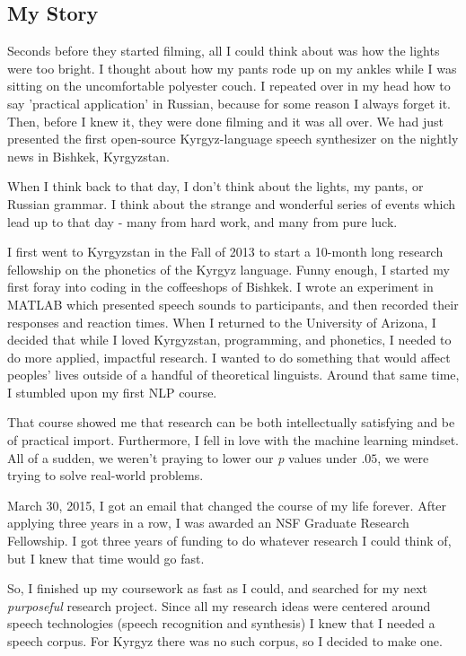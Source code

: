 \documentclass[12pt,a4paper]{article}
\begin{document}
\subsection*{My Story}

Seconds before they started filming, all I could think about was how the lights were too bright. I thought about how my pants rode up on my ankles while I was sitting on the uncomfortable polyester couch. I repeated over in my head how to say 'practical application' in Russian, because for some reason I always forget it. Then, before I knew it, they were done filming and it was all over. We had just presented the first open-source Kyrgyz-language speech synthesizer on the nightly news in Bishkek, Kyrgyzstan.

When I think back to that day, I don't think about the lights, my pants, or Russian grammar. I think about the strange and wonderful series of events which lead up to that day - many from hard work, and many from pure luck.

I first went to Kyrgyzstan in the Fall of 2013 to start a 10-month long research fellowship on the phonetics of the Kyrgyz language. Funny enough, I started my first foray into coding in the coffeeshops of Bishkek. I wrote an experiment in MATLAB which presented speech sounds to participants, and then recorded their responses and reaction times. When I returned to the University of Arizona, I decided that while I loved Kyrgyzstan, programming, and phonetics, I needed to do more applied, impactful research. I wanted to do something that would affect peoples' lives outside of a handful of theoretical linguists. Around that same time, I stumbled upon my first NLP course.

That course showed me that research can be both intellectually satisfying and be of practical import. Furthermore, I fell in love with the machine learning mindset. All of a sudden, we weren't praying to lower our \textit{p} values under $.05$, we were trying to solve real-world problems.

March 30, 2015, I got an email that changed the course of my life forever. After applying three years in a row, I was awarded an NSF Graduate Research Fellowship. I got three years of funding to do whatever research I could think of, but I knew that time would go fast.

So, I finished up my coursework as fast as I could, and searched for my next \textit{purposeful} research project. Since all my research ideas were centered around speech technologies (speech recognition and synthesis) I knew that I needed a speech corpus. For Kyrgyz there was no such corpus, so I decided to make one.
\end{document}
